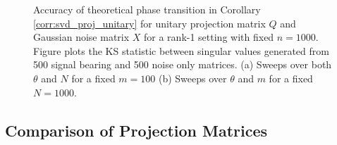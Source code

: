 \begin{figure}
\begin{center}
  \caption{Accuracy of theoretical phase transition in Corollary
    \ref{corr:svd_proj_unitary} for unitary projection matrix $Q$ and Gaussian noise
    matrix $X$ for a rank-1 setting with fixed $n=1000$. Figure plots the KS statistic
    between singular values generated from 500 signal bearing and 500 noise only
    matrices. (a) Sweeps over both $\theta$ and $N$ for a fixed $m=100$ (b) Sweeps over
    $\theta$ and $m$ for a fixed $N=1000$.}
  \label{fig:chpt7:orth_g}
\end{center}
\end{figure}

\subsection{Comparison of Projection Matrices}

